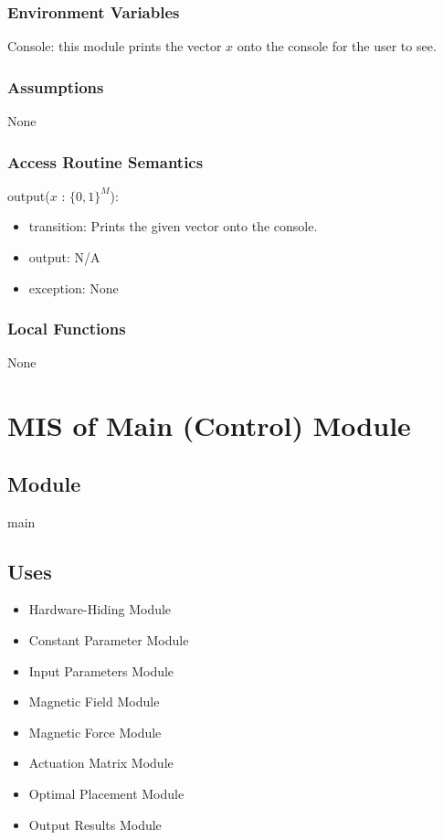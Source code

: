 \documentclass[12pt, titlepage]{article}
\begin{document}
\subsubsection{Environment Variables}
Console: this module prints the vector $x$ onto the console for the user to see.

\subsubsection{Assumptions}
None

\subsubsection{Access Routine Semantics}

\noindent output($x$ : $\{0,1\}^M$):
\begin{itemize}
\item transition: Prints the given vector onto the console. 
\item output: N/A 
\item exception: None
\end{itemize}

\subsubsection{Local Functions}
None 
\newpage

\section{MIS of Main (Control) Module} \label{MISControl}

\subsection{Module}
main 

\subsection{Uses}
\begin{itemize}
  \item Hardware-Hiding Module 
  \item Constant Parameter Module 
  \item Input Parameters Module 
  \item Magnetic Field Module 
  \item Magnetic Force Module 
  \item Actuation Matrix Module 
  \item Optimal Placement Module 
  \item Output Results Module 
\end{itemize}
\end{document}
